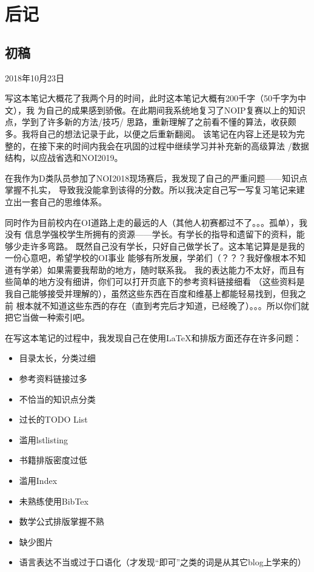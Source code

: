 \chapter{后记}
\section{初稿}
2018年10月23日

写这本笔记大概花了我两个月的时间，此时这本笔记大概有200千字（50千字为中文），我
为自己的成果感到骄傲。在此期间我系统地复习了NOIP复赛以上的知识点，学到了许多新的方法/技巧/
思路，重新理解了之前看不懂的算法，收获颇多。我将自己的想法记录于此，以便之后重新翻阅。
该笔记在内容上还是较为完整的，在接下来的时间内我会在巩固的过程中继续学习并补充新的高级算法
/数据结构，以应战省选和NOI2019。

在我作为D类队员参加了NOI2018现场赛后，我发现了自己的严重问题——知识点掌握不扎实，
导致我没能拿到该得的分数。所以我决定自己写一写复习笔记来建立出一套自己的思维体系。

同时作为目前校内在OI道路上走的最远的人（其他人初赛都过不了。。。孤单），我没有
信息学强校学生所拥有的资源——学长。有学长的指导和遗留下的资料，能够少走许多弯路。
既然自己没有学长，只好自己做学长了。这本笔记算是是我的一份心意吧，希望学校的OI事业
能够有所发展，学弟们（？？？我好像根本不知道有学弟）如果需要我帮助的地方，随时联系我。
我的表达能力不太好，而且有些简单的地方没有细讲，你们可以打开页底下的参考资料链接细看
（这些资料是我自己能够接受并理解的），虽然这些东西在百度和维基上都能轻易找到，但我之前
根本就不知道这些东西的存在（直到考完后才知道，已经晚了）。。。所以你们就把它当做一种索引吧。

在写这本笔记的过程中，我发现自己在使用\LaTeX{}和排版方面还存在许多问题：
\begin{itemize}
    \item 目录太长，分类过细
    \item 参考资料链接过多
    \item 不恰当的知识点分类
    \item 过长的TODO List
    \item 滥用lstlisting
    \item 书籍排版密度过低
    \item 滥用Index
    \item 未熟练使用BibTex
    \item 数学公式排版掌握不熟
    \item 缺少图片
    \item 语言表达不当或过于口语化（才发现``即可''之类的词是从其它blog上学来的）
\end{itemize}

